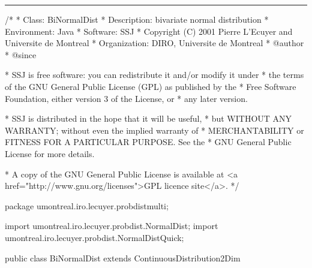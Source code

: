 \bigskip\hrule

\begin{code}
\begin{hide}
/*
 * Class:        BiNormalDist
 * Description:  bivariate normal distribution
 * Environment:  Java
 * Software:     SSJ 
 * Copyright (C) 2001  Pierre L'Ecuyer and Universite de Montreal
 * Organization: DIRO, Universite de Montreal
 * @author       
 * @since

 * SSJ is free software: you can redistribute it and/or modify it under
 * the terms of the GNU General Public License (GPL) as published by the
 * Free Software Foundation, either version 3 of the License, or
 * any later version.

 * SSJ is distributed in the hope that it will be useful,
 * but WITHOUT ANY WARRANTY; without even the implied warranty of
 * MERCHANTABILITY or FITNESS FOR A PARTICULAR PURPOSE.  See the
 * GNU General Public License for more details.

 * A copy of the GNU General Public License is available at
   <a href="http://www.gnu.org/licenses">GPL licence site</a>.
 */
\end{hide}
package umontreal.iro.lecuyer.probdistmulti;
\begin{hide}
import umontreal.iro.lecuyer.probdist.NormalDist;
import umontreal.iro.lecuyer.probdist.NormalDistQuick;
\end{hide}

public class BiNormalDist extends ContinuousDistribution2Dim \begin{hide} {
   protected int ndigit;        // Number of decimal digits of accuracy
   protected double mu1, mu2;
   protected double sigma1, sigma2;
   protected double rho;
   protected double racRho;        // sqrt(1 - rho^2)
   protected double detS;          // 2*PI*sigma1*sigma2*sqrt(1 - rho^2)
   protected static final double RHO_SMALL = 1.0e-8; // neglect small rhos

   private static final double Z[] = { 
      0.04691008, 0.23076534, 0.5, 0.76923466, 0.95308992 };

   private static final double W[] = {
      0.018854042, 0.038088059, 0.0452707394, 0.038088059, 0.018854042 };

   private static final double AGauss[] = {
      -0.72657601, 0.71070688, -0.142248368, 0.127414796 };

\end{hide}
\end{code}
